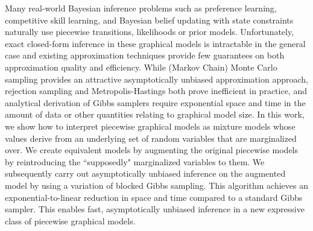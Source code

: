 Many real-world Bayesian inference problems such as preference learning, competitive skill learning, and Bayesian belief updating with state constraints naturally use piecewise transitions, likelihoods or prior models. Unfortunately, exact closed-form inference in these graphical models is intractable in the general case and existing approximation techniques provide few guarantees on both approximation quality and efficiency. While (Markov Chain) Monte Carlo sampling provides an attractive asymptotically unbiased approximation approach, rejection sampling and Metropolis-Hastings both prove inefficient in practice, and analytical derivation of Gibbs samplers require exponential space and time in the amount of data or other quantities relating to graphical model size. 
In this work, we show how to interpret piecewise graphical models as mixture models whose values derive from an underlying set of random variables that are marginalized over. 
We create equivalent models by augmenting the original piecewise models by reintroducing the ``supposedly" marginalized variables to them. We subsequently carry out asymptotically unbiased inference on the augmented model by using a variation of blocked Gibbs sampling. This algorithm achieves an exponential-to-linear reduction in space and time compared to a standard Gibbs sampler. This enables fast, asymptotically unbiased inference in a new expressive class of piecewise graphical models. 